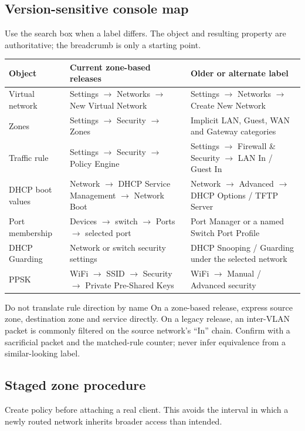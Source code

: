 \subsection*{Version-sensitive console map}
Use the search box when a label differs.  The object and resulting property are
authoritative; the breadcrumb is only a starting point.

\begin{tabularx}{\linewidth}{@{}p{.20\linewidth}p{.31\linewidth}L@{}}
\toprule
\textbf{Object} & \textbf{Current zone-based releases} & \textbf{Older or alternate label}\\
\midrule
Virtual network & Settings $\rightarrow$ Networks $\rightarrow$ New Virtual Network &
Settings $\rightarrow$ Networks $\rightarrow$ Create New Network\\
Zones & Settings $\rightarrow$ Security $\rightarrow$ Zones &
Implicit LAN, Guest, WAN and Gateway categories\\
Traffic rule & Settings $\rightarrow$ Security $\rightarrow$ Policy Engine &
Settings $\rightarrow$ Firewall \& Security $\rightarrow$ LAN In / Guest In\\
DHCP boot values & Network $\rightarrow$ DHCP Service Management $\rightarrow$ Network Boot &
Network $\rightarrow$ Advanced $\rightarrow$ DHCP Options / TFTP Server\\
Port membership & Devices $\rightarrow$ switch $\rightarrow$ Ports $\rightarrow$ selected port &
Port Manager or a named Switch Port Profile\\
DHCP Guarding & Network or switch security settings &
DHCP Snooping / Guarding under the selected network\\
PPSK & WiFi $\rightarrow$ SSID $\rightarrow$ Security $\rightarrow$ Private Pre-Shared Keys &
WiFi $\rightarrow$ Manual / Advanced security\\
\bottomrule
\end{tabularx}

\begin{telospanel}{Do not translate rule direction by name}
On a zone-based release, express source zone, destination zone and service
directly.  On a legacy release, an inter-VLAN packet is commonly filtered on
the source network's ``In'' chain.  Confirm with a sacrificial packet and the
matched-rule counter; never infer equivalence from a similar-looking label.
\end{telospanel}

\subsection*{Staged zone procedure}
Create policy before attaching a real client.  This avoids the interval in
which a newly routed network inherits broader access than intended.

